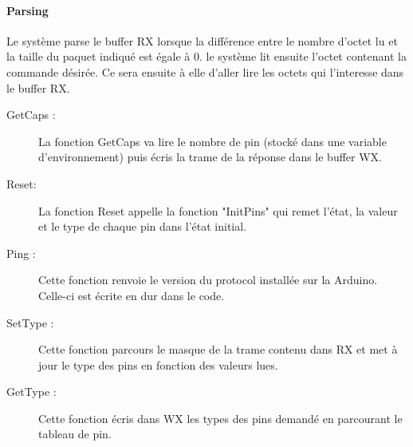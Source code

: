 \paragraph{Parsing} 

Le système parse le buffer RX lorsque la différence entre le nombre
d'octet lu et la taille du paquet indiqué est égale à 0. le système
lit ensuite l'octet contenant la commande désirée. Ce sera ensuite à
elle d'aller lire les octets qui l'interesse dans le buffer RX.

\begin{description}
\item[GetCaps :] La fonction GetCaps va lire le nombre de pin (stocké dans une variable d'environnement) puis écris la trame de la réponse dans le buffer WX.
\item[Reset:] La fonction Reset appelle la fonction "InitPins" qui remet l'état, la valeur et le type de chaque pin dans l'état initial.
\item[Ping :] Cette fonction renvoie le version du protocol installée sur la Arduino. Celle-ci est écrite en dur dans le code.
\item[SetType :] Cette fonction parcours le masque de la trame contenu dans RX et met à jour le type des pins en fonction des valeurs lues.
\item[GetType :] Cette fonction écris dans WX les types des pins demandé en parcourant le tableau de pin.
\end{description}
